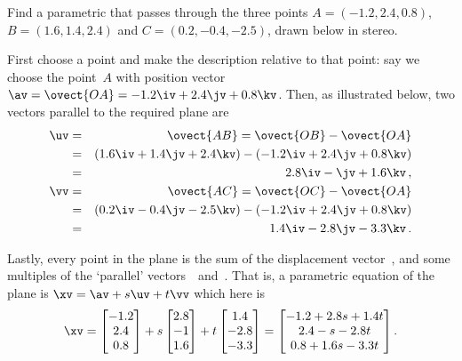 \begin{example} 
Find a parametric  that passes through the three points \(A=(-1.2,2.4,0.8)\), \(B=(1.6,1.4,2.4)\) and \(C=(0.2,-0.4,-2.5)\), drawn below in stereo.

\begin{solution} 
First choose a point and make the description relative to that point: say we choose the point~\(A\) with position vector \(\av=\ovect{OA}=-1.2\iv+2.4\jv+0.8\kv\).
Then, as illustrated below, two vectors parallel to the required plane are 
\begin{eqnarray*}
\uv&=&\ovect{AB} =\ovect{OB}-\ovect{OA} 
\\&=&(1.6\iv+1.4\jv+2.4\kv)-(-1.2\iv+2.4\jv+0.8\kv) 
\\&=&2.8\iv-\jv+1.6\kv\,,
\\\vv&=&\ovect{AC} =\ovect{OC}-\ovect{OA} 
\\&=&(0.2\iv-0.4\jv-2.5\kv)-(-1.2\iv+2.4\jv+0.8\kv) 
\\&=&1.4\iv-2.8\jv-3.3\kv\,.
\end{eqnarray*}
\begin{center}\end{center}
Lastly, every point in the plane is the sum of the displacement vector~\av, and some multiples of the `parallel' vectors~\uv\ and~\vv.
That is, a parametric equation of the plane is \(\xv=\av+s\uv+t\vv\) which here is
\begin{equation*}
\xv=\begin{bmatrix} -1.2\\2.4\\0.8 \end{bmatrix}
+s\begin{bmatrix} 2.8\\-1\\1.6 \end{bmatrix}
+t\begin{bmatrix} 1.4\\-2.8\\-3.3 \end{bmatrix}
=\begin{bmatrix} -1.2+2.8s+1.4t\\2.4-s-2.8t\\0.8+1.6s-3.3t \end{bmatrix}.
\end{equation*}
\end{solution}
\end{example}
\endgroup



